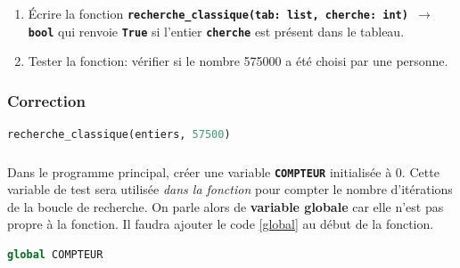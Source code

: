\documentclass[svgnames,11pt]{beamer}
\begin{document}
\begin{frame}[fragile]
    \frametitle{}

    \begin{activite}
        \begin{enumerate}
            \item Écrire la fonction \textbf{\texttt{recherche\_classique(tab: list, cherche: int) $\rightarrow$ bool}} qui renvoie \textbf{\texttt{True}} si l'entier \textbf{\texttt{cherche}} est présent dans le tableau.
            \item Tester la fonction: vérifier si le nombre 575000 a été choisi par une personne.
        \end{enumerate}
    \end{activite} 
\end{frame}
\begin{frame}[fragile]
    \frametitle{Correction}

    \begin{center}
        
    \end{center}

    \begin{center}
    \begin{lstlisting}[language=Python , basicstyle=\ttfamily\small, xleftmargin=2em, xrightmargin=2em]
recherche_classique(entiers, 57500)
\end{lstlisting}
    \label{CODE}
    \end{center}
\end{frame}
\begin{frame}[fragile]
    \frametitle{}
    \setcounter{compteuractivite}{1}

    \begin{activite}
        Dans le programme principal, créer une variable \textbf{\texttt{COMPTEUR}} initialisée à 0. Cette variable de test sera utilisée \emph{dans la fonction} pour compter le nombre d'itérations de la boucle de recherche. On parle alors de \textbf{variable globale} car elle n'est pas propre à la fonction. Il faudra ajouter le code \ref{global} au début de la fonction.
        \begin{center}
        \begin{lstlisting}[language=Python  , xleftmargin=2em, xrightmargin=2em]
global COMPTEUR
\end{lstlisting}
        \label{global}
        \end{center}
    \end{activite}

\end{frame}
\end{document}
